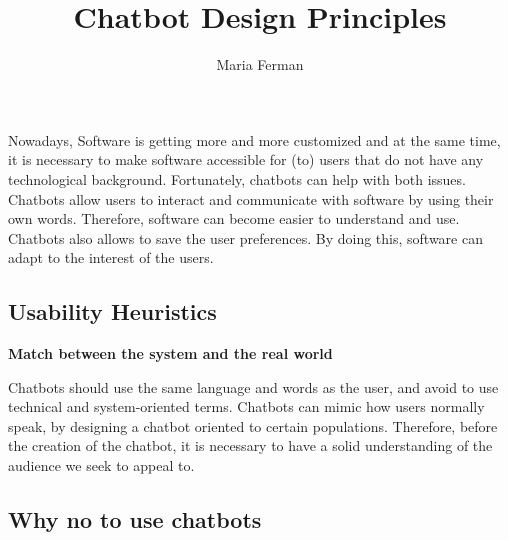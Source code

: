 \documentclass[a4paper,10pt]{article}
\title{Chatbot Design Principles}
\author{Maria Ferman}
\begin{document}
\maketitle

Nowadays, Software is getting more and more customized and at the same time, it is necessary to make software accessible for (to) users that do not have any technological background. Fortunately, chatbots can help with both issues. Chatbots allow users to interact and communicate with software by using their own words. Therefore, software can become easier to understand and use. Chatbots also allows to save the user preferences. By doing this, software can adapt to the interest of the users.   

\subsection*{Usability Heuristics}

\textbf{Match between the system and the real world}

Chatbots should use the same language and words as the user, and avoid to use technical and system-oriented terms. Chatbots can mimic how users normally speak, by designing a chatbot oriented to certain populations. Therefore, before the creation of the chatbot, it is necessary to have a solid understanding of the audience we seek to appeal to\cite{HeuristicsWebPage}.  

\subsection*{Why no to use chatbots}



\medskip


\end{document}
